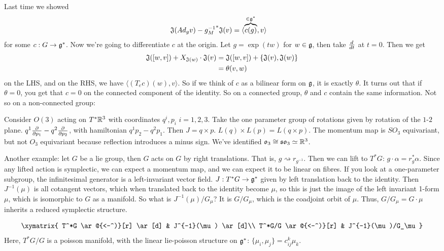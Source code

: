  Last time we showed
 \begin{align*}
   \mathfrak{J}(Ad_g v)-{g^{-1}_M}^*\mathfrak{J}(v) &= \langle \overbrace{c(g)}^{\in \mathfrak{g}^*},v\rangle
 \end{align*}
 for some $c:G\to \mathfrak{g}^*$.  Now we're going to differentiate $c$ at the origin.  Let
$g=\exp(tw)$ for $w\in \mathfrak{g}$, then take $\frac{d }{d t}$ at $t=0$.  Then we get
\begin{align*}
  \mathfrak{J}([w,v])+X_{\mathfrak{J}(w)}\cdot \mathfrak{J}(v) &= \mathfrak{J}([w,v])+\{\mathfrak{J}(v),\mathfrak{J}(w)\} \\
  &= \theta(v,w)
\end{align*}
on the LHS, and on the RHS, we have $\langle (T_e c)(w),v\rangle$.  So if we think of
$c$ as a bilinear form on $\mathfrak{g}$, it is exactly $\theta$.  It turns out that if
$\theta=0$, you get that $c=0$ on the connected component of the identity.  So on a
connected group, $\theta$ and $c$ contain the same information.  Not so on a
non-connected group:

Consider $O(3)$ acting on $T^*\mathbb{R}^3$ with coordinates $q^i,p_i$ $i=1,2,3$.  Take the
one parameter group of rotations given by rotation of the $1$-$2$ plane.
$q^1\frac{\partial }{\partial p_1} -q^2\frac{\partial }{\partial p_2}$, with hamiltonian $q^1p_2-q^2p_1$.  Then $J=q\times
p$. $L(q)\times L(p)=L(q\times p)$.  The momentum map is $SO_3$ equivariant, but not
$O_3$ equivariant because reflection introduces a minus sign.  We've identified
$\mathfrak{o}_3\cong \mathfrak{so}_3\simeq \mathbb{R}^3$.

 Another example: let $G$ be a lie group, then $G$ acts on $G$ by right translations.
 That is, $g\rightsquigarrow r_{g^{-1}}$.  Then we can lift to $T^*G$: $g\cdot \alpha =
 r_{g}^*\alpha$.  Since any lifted action is symplectic, we can expect a momentum map,
 and we can expect it to be linear on fibres.  If you look at a one-parameter
 subgroup, the infinitesimal generator is a left-invariant vector field.  $J:T^*G\to
 \mathfrak{g}^*$ given by left translation back to the identity.  Then $J^{-1}(\mu)$ is all
 cotangent vectors, which when translated back to the identity become $\mu$, so this
 is just the image of the left invariant 1-form $\mu$, which is isomorphic to $G$ as a
 manifold.  So what is $J^{-1}(\mu)/G_\mu$?  It is $G/G_\mu$, which is the coadjoint
 orbit of $\mu$.  Thus, $G/G_\mu=G\cdot \mu$ inherits a reduced symplectic structure.

 \[\xymatrix{
 T^*G \ar@{<-^)}[r] \ar[d] & J^{-1}(\mu) \ar[d]\\
 T^*G/G \ar@{<-^)}[r] & J^{-1}(\mu)/G_\mu
 }\]
 Here, $T^*G/G$ is a poisson manifold, with the linear lie-poisson structure on
 $\mathfrak{g}^*$: $\{\mu_i,\mu_j\}=c_{ij}^k\mu_k$.

